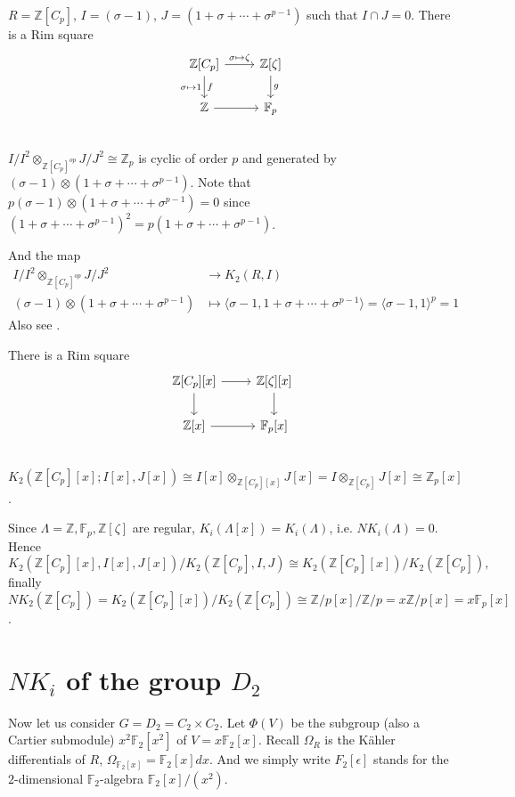 \begin{example}[{$\mathbb{Z}[C_p]$}]
	$R=\mathbb{Z}[C_p]$, $I=(\sigma-1)$, $J=(1+\sigma+\cdots+\sigma^{p-1})$ such that $I\cap J =0$. There is a Rim square
		\[\begin{tikzcd}
			\mathbb{Z}[C_p] \ar[r,"\sigma \mapsto \zeta"] \ar[d,"f","\sigma\mapsto 1"']& \mathbb{Z}[\zeta]\ar[d,"g"]\\
			\mathbb{Z} \ar[r] & \mathbb{F}_p\\
		\end{tikzcd}\]
$I/I^2\otimes_{\mathbb{Z}[C_p]^{op}}J/J^2 \cong \mathbb{Z}_p$ is cyclic of order $p$ and generated by $(\sigma-1)\otimes(1+\sigma+\cdots+\sigma^{p-1})$. Note that $p(\sigma-1)\otimes(1+\sigma+\cdots+\sigma^{p-1})=0$ since $(1+\sigma+\cdots+\sigma^{p-1})^2=p(1+\sigma+\cdots+\sigma^{p-1})$.

And the map 
\begin{align*}
I/I^2\otimes_{\mathbb{Z}[C_p]^{op}}J/J^2 &\longrightarrow K_2(R,I)\\
(\sigma-1)\otimes(1+\sigma+\cdots+\sigma^{p-1}) & \mapsto \langle \sigma-1,1+\sigma+\cdots+\sigma^{p-1} \rangle =\langle \sigma-1,1\rangle^p=1
\end{align*}
Also see \cite{STEIN1980213}.

\end{example}
\begin{example}[{$\mathbb{Z}[C_p][x]$}]
	There is a Rim square
		\[\begin{tikzcd}
			\mathbb{Z}[C_p][x] \ar[r] \ar[d]& \mathbb{Z}[\zeta][x]\ar[d]\\
			\mathbb{Z}[x] \ar[r] & \mathbb{F}_p[x]\\
		\end{tikzcd}\]
$K_2(\mathbb{Z}[C_p][x];I[x],J[x])\cong I[x]\otimes_{\mathbb{Z}[C_p][x]} J[x] =I\otimes_{\mathbb{Z}[C_p]} J[x]\cong \mathbb{Z}_p[x]$.

Since $\Lambda=\mathbb{Z}, \mathbb{F}_p, \mathbb{Z}[\zeta]$ are regular, $K_i(\Lambda[x]) = K_i(\Lambda)$, i.e. $NK_i(\Lambda)=0$. Hence 
\[K_2(\mathbb{Z}[C_p][x],I[x],J[x])/K_2(\mathbb{Z}[C_p],I,J)\cong K_2(\mathbb{Z}[C_p][x])/K_2(\mathbb{Z}[C_p]),\]
finally $NK_2(\mathbb{Z}[C_p]) = K_2(\mathbb{Z}[C_p][x])/K_2(\mathbb{Z}[C_p]) \cong \mathbb{Z}/p[x]/\mathbb{Z}/p=x \mathbb{Z}/p [x]= x \mathbb{F}_p[x]$.
\end{example}
\section{\texorpdfstring{$NK_i$}{NKi} of the group \texorpdfstring{$D_2$}{D2}}
\label{sec:D2}
Now let us consider $G=D_2=C_2\times C_2$. Let $\Phi (V)$ be the subgroup (also a Cartier submodule) $x^2 \mathbb{F}_2[x^2]$ of $V=x \mathbb{F}_2[x]$. Recall $\Omega_R$ is the K\"{a}hler differentials of $R$, $\Omega_{\mathbb{F}_2[x]}=\mathbb{F}_2[x]dx$. And we simply write $F_2[\epsilon]$ stands for the $2$-dimensional $\mathbb{F}_2$-algebra $\mathbb{F}_2[x]/(x^2)$.

